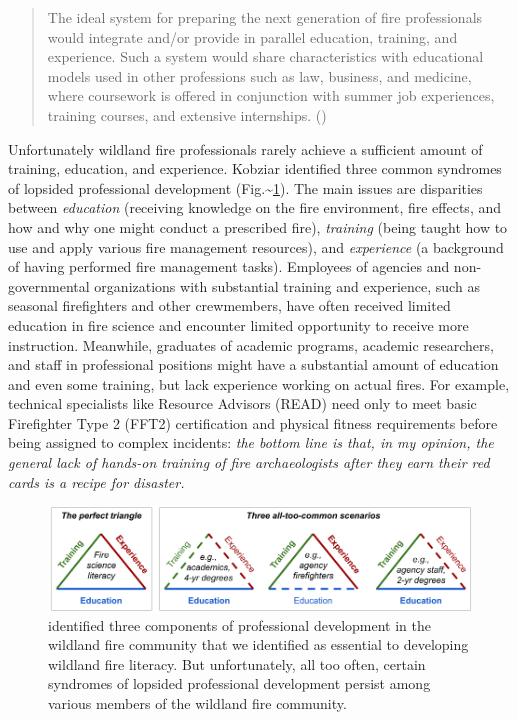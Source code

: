 \documentclass[fire,article,submit,moreauthors,pdftex]{Definitions/mdpi}
\begin{document}
\begin{quote}
The ideal system for preparing the next generation of fire professionals would integrate and/or provide in parallel education, training, and experience.
Such a system would share characteristics with educational models used in other professions such as law, business, and medicine, where coursework is offered in conjunction with summer job experiences, training courses, and extensive internships. (\citet[][p.344]{kobziar2009})
\end{quote}

Unfortunately wildland fire professionals rarely achieve a sufficient amount of training, education, and experience.
Kobziar \citep{kobziar2009} identified three common syndromes of lopsided professional development (Fig.\textasciitilde{}\ref{FireTrainingTriangles}).
The main issues are disparities between \emph{education} (receiving knowledge on the fire environment, fire effects, and how and why one might conduct a prescribed fire), \emph{training} (being taught how to use and apply various fire management resources), and \emph{experience} (a background of having performed fire management tasks).
Employees of agencies and non-governmental organizations with substantial training and experience, such as seasonal firefighters and other crewmembers, have often received limited education in fire science and encounter limited opportunity to receive more instruction.
Meanwhile, graduates of academic programs, academic researchers, and staff in professional positions might have a substantial amount of education and even some training, but lack experience working on actual fires.
For example, technical specialists like Resource Advisors (READ) need only to meet basic Firefighter Type 2 (FFT2) certification and physical fitness requirements before being assigned to complex incidents: \emph{the bottom line is that, in my opinion, the general lack of hands-on training of fire archaeologists after they earn their red cards is a recipe for disaster.} \citep[p.~3]{hangan2010}

\begin{figure}
\centering
\includegraphics[width=1\columnwidth]{FireTrainingTriangles.png}
\caption{\citet{kobziar2009} identified three components of professional development in the wildland fire community that we identified as essential to developing wildland fire literacy. But unfortunately, all too often, certain syndromes of lopsided professional development persist among various members of the wildland fire community. \label{FireTrainingTriangles}}
\end{figure}
\end{document}
